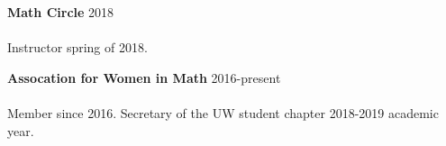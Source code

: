 \documentclass[12 pt]{article}
\newcommand{\lineunder}{\vspace*{-8pt} \\ \hspace*{-18pt} \hrulefill \\}
\newcommand{\header}[1]{{\hspace*{-15pt}\vspace*{6pt} \selectfont{\textsc{#1}}} \vspace*{-6pt} \lineunder}
\newcommand{\employer}[3]{{ \textbf{#1} \hfill #2 \\ #3\\  }}
\begin{document}
\employer{Math Circle}{2018}{~}
\vspace{-5mm}
Instructor spring of 2018.


\bigskip
\employer{Assocation for Women in Math}{2016-present}{~}
\vspace{-5mm}
Member since 2016. Secretary of the UW student chapter 2018-2019 academic year.















\end{document}
